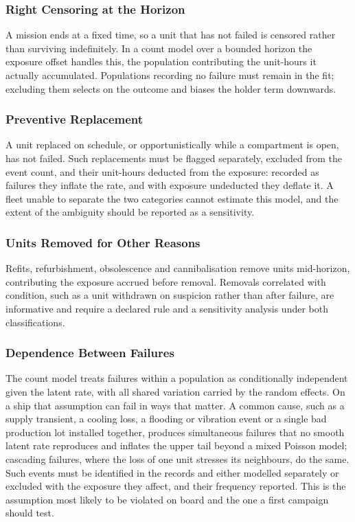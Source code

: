 \subsubsection{Right Censoring at the Horizon}
A mission ends at a fixed time, so a unit
that has not failed is censored rather than surviving indefinitely. In a count
model over a bounded horizon the exposure offset handles this, the population
contributing the unit-hours it actually accumulated. Populations recording no
failure must remain in the fit; excluding them selects on the outcome and biases
the holder term downwards.

\subsubsection{Preventive Replacement}
A unit replaced on schedule, or opportunistically while a compartment is open, has
not failed. Such replacements must be flagged separately, excluded from the event
count, and their unit-hours deducted from the exposure: recorded as failures they
inflate the rate, and with exposure undeducted they deflate it. A fleet unable to
separate the two categories cannot estimate this model, and the extent of the
ambiguity should be reported as a sensitivity.

\subsubsection{Units Removed for Other Reasons}
Refits, refurbishment, obsolescence and cannibalisation remove units mid-horizon,
contributing the exposure accrued before removal. Removals correlated with
condition, such as a unit withdrawn on suspicion rather than after failure, are
informative and require a declared rule and a sensitivity analysis under both
classifications.

\subsubsection{Dependence Between Failures}
The count model treats failures within a
population as conditionally independent given the latent rate, with all shared
variation carried by the random effects. On a ship that assumption can fail in
ways that matter. A common cause, such as a supply transient, a cooling loss, a
flooding or vibration event or a single bad production lot installed together,
produces simultaneous failures that no smooth latent rate reproduces and inflates
the upper tail beyond a mixed Poisson model; cascading failures, where the loss of
one unit stresses its neighbours, do the same. Such events must be identified in
the records and either modelled separately or excluded with the exposure they
affect, and their frequency reported. This is the assumption most likely to be
violated on board and the one a first campaign should test.

